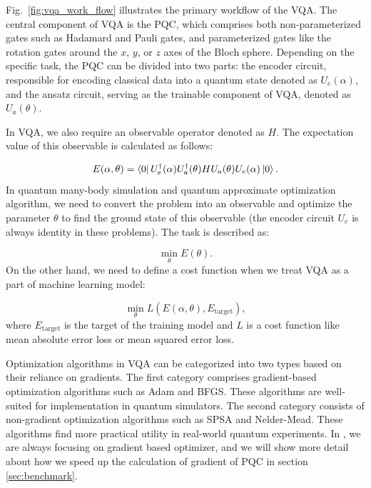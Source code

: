 Fig.~\ref{fig:vqa_work_flow} illustrates the primary workflow of the VQA. The central component of VQA is the PQC, which comprises both non-parameterized gates such as Hadamard and Pauli gates, and parameterized gates like the rotation gates around the $x$, $y$, or $z$ axes of the Bloch sphere. Depending on the specific task, the PQC can be divided into two parts: the encoder circuit, responsible for encoding classical data into a quantum state denoted as $U_e(\alpha)$, and the ansatz circuit, serving as the trainable component of VQA, denoted as $U_a(\theta)$.

In VQA, we also require an observable operator denoted as $H$. The expectation value of this observable is calculated as follows:

\begin{equation}
  E(\alpha, \theta) = \bra{0}U_e^\dagger(\alpha)U_a^\dagger(\theta)HU_a(\theta)U_e(\alpha)\ket{0}.
\end{equation}
In quantum many-body simulation and quantum approximate optimization algorithm, we need to convert the problem into an observable and optimize the parameter $\theta$ to find the ground state of this observable (the encoder circuit $U_e$ is always identity in these problems). The task is described as:

\begin{equation}
  \min_\theta E(\theta).
\end{equation}
On the other hand, we need to define a cost function when we treat VQA as a part of machine learning model:

\begin{equation}
  \min_\theta L(E(\alpha, \theta), E_\text{target}),
\end{equation}
where $E_\text{target}$ is the target of the training model and $L$ is a cost function like mean absolute error loss or mean squared error loss.

Optimization algorithms in VQA can be categorized into two types based on their reliance on gradients. The first category comprises gradient-based optimization algorithms such as Adam and BFGS. These algorithms are well-suited for implementation in quantum simulators. The second category consists of non-gradient optimization algorithms such as SPSA and Nelder-Mead. These algorithms find more practical utility in real-world quantum experiments. In \MindQuantum, we are always focusing on gradient based optimizer, and we will show more detail about how we speed up the calculation of gradient of PQC in section \ref{sec:benchmark}.

